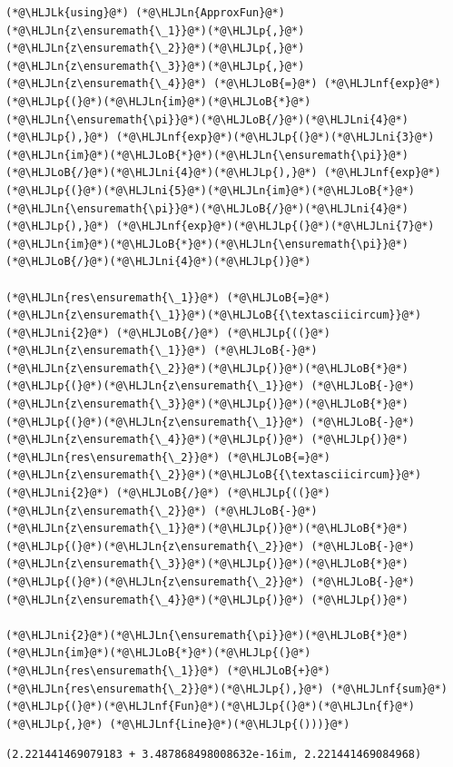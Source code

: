 \documentclass[12pt,a4paper]{article}
\newcommand{\HLJLk}[1]{\textcolor[RGB]{148,91,176}{\textbf{#1}}}
\newcommand{\HLJLn}[1]{#1}
\newcommand{\HLJLnf}[1]{\textcolor[RGB]{66,102,213}{#1}}
\newcommand{\HLJLni}[1]{\textcolor[RGB]{59,151,46}{#1}}
\newcommand{\HLJLoB}[1]{\textcolor[RGB]{102,102,102}{\textbf{#1}}}
\newcommand{\HLJLp}[1]{#1}
\begin{document}
\begin{lstlisting}
(*@\HLJLk{using}@*) (*@\HLJLn{ApproxFun}@*)
(*@\HLJLn{z\ensuremath{\_1}}@*)(*@\HLJLp{,}@*)(*@\HLJLn{z\ensuremath{\_2}}@*)(*@\HLJLp{,}@*)(*@\HLJLn{z\ensuremath{\_3}}@*)(*@\HLJLp{,}@*)(*@\HLJLn{z\ensuremath{\_4}}@*) (*@\HLJLoB{=}@*) (*@\HLJLnf{exp}@*)(*@\HLJLp{(}@*)(*@\HLJLn{im}@*)(*@\HLJLoB{*}@*)(*@\HLJLn{\ensuremath{\pi}}@*)(*@\HLJLoB{/}@*)(*@\HLJLni{4}@*)(*@\HLJLp{),}@*) (*@\HLJLnf{exp}@*)(*@\HLJLp{(}@*)(*@\HLJLni{3}@*)(*@\HLJLn{im}@*)(*@\HLJLoB{*}@*)(*@\HLJLn{\ensuremath{\pi}}@*)(*@\HLJLoB{/}@*)(*@\HLJLni{4}@*)(*@\HLJLp{),}@*) (*@\HLJLnf{exp}@*)(*@\HLJLp{(}@*)(*@\HLJLni{5}@*)(*@\HLJLn{im}@*)(*@\HLJLoB{*}@*)(*@\HLJLn{\ensuremath{\pi}}@*)(*@\HLJLoB{/}@*)(*@\HLJLni{4}@*)(*@\HLJLp{),}@*) (*@\HLJLnf{exp}@*)(*@\HLJLp{(}@*)(*@\HLJLni{7}@*)(*@\HLJLn{im}@*)(*@\HLJLoB{*}@*)(*@\HLJLn{\ensuremath{\pi}}@*)(*@\HLJLoB{/}@*)(*@\HLJLni{4}@*)(*@\HLJLp{)}@*)

(*@\HLJLn{res\ensuremath{\_1}}@*) (*@\HLJLoB{=}@*) (*@\HLJLn{z\ensuremath{\_1}}@*)(*@\HLJLoB{{\textasciicircum}}@*)(*@\HLJLni{2}@*) (*@\HLJLoB{/}@*) (*@\HLJLp{((}@*)(*@\HLJLn{z\ensuremath{\_1}}@*) (*@\HLJLoB{-}@*) (*@\HLJLn{z\ensuremath{\_2}}@*)(*@\HLJLp{)}@*)(*@\HLJLoB{*}@*)(*@\HLJLp{(}@*)(*@\HLJLn{z\ensuremath{\_1}}@*) (*@\HLJLoB{-}@*) (*@\HLJLn{z\ensuremath{\_3}}@*)(*@\HLJLp{)}@*)(*@\HLJLoB{*}@*)(*@\HLJLp{(}@*)(*@\HLJLn{z\ensuremath{\_1}}@*) (*@\HLJLoB{-}@*) (*@\HLJLn{z\ensuremath{\_4}}@*)(*@\HLJLp{)}@*) (*@\HLJLp{)}@*)
(*@\HLJLn{res\ensuremath{\_2}}@*) (*@\HLJLoB{=}@*) (*@\HLJLn{z\ensuremath{\_2}}@*)(*@\HLJLoB{{\textasciicircum}}@*)(*@\HLJLni{2}@*) (*@\HLJLoB{/}@*) (*@\HLJLp{((}@*)(*@\HLJLn{z\ensuremath{\_2}}@*) (*@\HLJLoB{-}@*) (*@\HLJLn{z\ensuremath{\_1}}@*)(*@\HLJLp{)}@*)(*@\HLJLoB{*}@*)(*@\HLJLp{(}@*)(*@\HLJLn{z\ensuremath{\_2}}@*) (*@\HLJLoB{-}@*) (*@\HLJLn{z\ensuremath{\_3}}@*)(*@\HLJLp{)}@*)(*@\HLJLoB{*}@*)(*@\HLJLp{(}@*)(*@\HLJLn{z\ensuremath{\_2}}@*) (*@\HLJLoB{-}@*) (*@\HLJLn{z\ensuremath{\_4}}@*)(*@\HLJLp{)}@*) (*@\HLJLp{)}@*)

(*@\HLJLni{2}@*)(*@\HLJLn{\ensuremath{\pi}}@*)(*@\HLJLoB{*}@*)(*@\HLJLn{im}@*)(*@\HLJLoB{*}@*)(*@\HLJLp{(}@*)(*@\HLJLn{res\ensuremath{\_1}}@*) (*@\HLJLoB{+}@*) (*@\HLJLn{res\ensuremath{\_2}}@*)(*@\HLJLp{),}@*) (*@\HLJLnf{sum}@*)(*@\HLJLp{(}@*)(*@\HLJLnf{Fun}@*)(*@\HLJLp{(}@*)(*@\HLJLn{f}@*)(*@\HLJLp{,}@*) (*@\HLJLnf{Line}@*)(*@\HLJLp{()))}@*)
\end{lstlisting}

\begin{lstlisting}
(2.221441469079183 + 3.487868498008632e-16im, 2.221441469084968)
\end{lstlisting}
\end{document}
